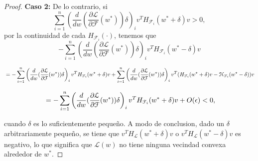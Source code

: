 \begin{proof}
    \textbf{Caso 2:} De lo contrario, si 
    \[
    \sum_{i=1}^{n} \left( \frac{d}{dw} (\frac{\partial \mathcal{L}}{\partial \mathcal{F}}(w^*))\delta \right)_i v^T H_{\mathcal{F}_i}(w^* + \delta) v > 0,
    \]
    por la continuidad de cada $H_{\mathcal{F}_i}(\cdot)$, tenemos que
    \[
        -\sum_{i=1}^{n} \left( \frac{d}{dw} (\frac{\partial \mathcal{L}}{\partial \mathcal{F}}(w^*))\delta \right)_i v^T H_{\mathcal{F}_i}(w^* - \delta) v
    \]

    \[
        \\ = -\sum_{i=1}^{n} \left( \frac{d}{dw} (\frac{\partial \mathcal{L}}{\partial \mathcal{F}}(w^*))\delta \right)_i v^T H_{\mathcal{F}_i}(w^* + \delta) v + \sum_{i=1}^{n} \left( \frac{d}{dw} (\frac{\partial \mathcal{L}}{\partial \mathcal{F}}(w^*))\delta \right)_i v^T (H_{\mathcal{F}_i}(w^* + \delta) v - \mathcal{H}_{\mathcal{F}_i}(w^* - \delta)) v
    \]

    \[
        \\ = -\sum_{i=1}^{n} \left( \frac{d}{dw} (\frac{\partial \mathcal{L}}{\partial \mathcal{F}}(w^*))\delta \right)_i v^T H_{\mathcal{F}_i}(w^* + \delta) v + O(\epsilon) < 0,
    \]
    
    cuando $\delta$ es lo suficientemente pequeño. A modo de conclusion, dado un $\delta$ arbitrariamente pequeño, se tiene que $v^T H_{\mathcal{L}}(w^* + \delta) v$ o $v^T H_{\mathcal{L}}(w^* - \delta) v$ es negativo, lo que significa que $\mathcal{L}(w)$ no tiene ninguna vecindad convexa alrededor de $w^*$.

\end{proof}

\endinput
